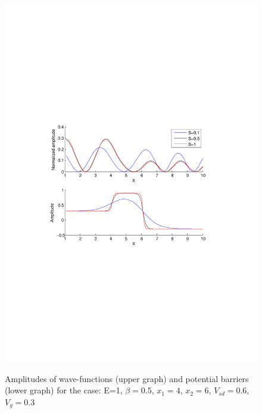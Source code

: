 \documentclass[•]{beamer}
\theoremstyle{remark}
\begin{document}
\begin{frame}
\begin{figure}
\centering
\caption{Amplitudes of wave-functions (upper graph) and potential barriers (lower graph) for the case: E=1, $\beta=0.5$, $x_1=4$, $x_2=6$, $V_{sd}=0.6$, $V_g=0.3$}
\includegraphics[scale=0.4, trim = 0mm 20mm 0mm 60mm, clip]{test2}
\label{fig:test2}
\end{figure}
\end{frame}
\end{document}

